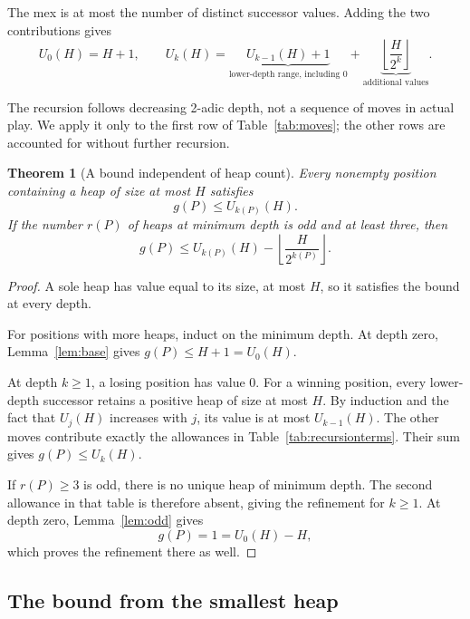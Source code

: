 \documentclass[10pt,a4paper]{article}
\newtheorem{theorem}{Theorem}[section]
\begin{document}
The mex is at most the number of distinct successor values.
Adding the two contributions gives
\begin{equation}
 U_0(H)=H+1,
 \qquad
 \boxed{
 U_k(H)=
 \underbrace{U_{k-1}(H)+1}_{\text{lower-depth range, including }0}
 +\underbrace{\left\lfloor\frac{H}{2^k}\right\rfloor}_{
 \text{additional values}}.
 }
 \label{eq:recursion}
\end{equation}

The recursion follows decreasing 2-adic depth, not a sequence
of moves in actual play. We apply it only to the first row
of Table~\ref{tab:moves}; the other rows are accounted for
without further recursion.

\begin{theorem}[A bound independent of heap count]
\label{thm:bound}
Every nonempty position containing a heap of size at most $H$
satisfies
\[
 g(P)\le U_{k(P)}(H).
\]
If the number $r(P)$ of heaps at minimum depth is odd and at
least three, then
\begin{equation}
 g(P)\le
 U_{k(P)}(H)
 -
 \left\lfloor\frac{H}{2^{k(P)}}\right\rfloor.
 \label{eq:refined}
\end{equation}
\end{theorem}

\begin{proof}
A sole heap has value equal to its size, at most $H$, so it
satisfies the bound at every depth.

For positions with more heaps, induct on the minimum depth.
At depth zero, Lemma~\ref{lem:base} gives
$g(P)\le H+1=U_0(H)$.

At depth $k\ge1$, a losing position has value $0$.
For a winning position, every lower-depth successor retains
a positive heap of size at most $H$. By induction and the
fact that $U_j(H)$ increases with $j$, its value is at most
$U_{k-1}(H)$. The other moves contribute exactly the allowances
in Table~\ref{tab:recursionterms}. Their sum gives
$g(P)\le U_k(H)$.

If $r(P)\ge3$ is odd, there is no unique heap of minimum depth.
The second allowance in that table is therefore absent, giving
the refinement for $k\ge1$. At depth zero, Lemma~\ref{lem:odd}
gives
\[
 g(P)=1=U_0(H)-H,
\]
which proves the refinement there as well.
\end{proof}

\subsection{The bound from the smallest heap}
\end{document}
